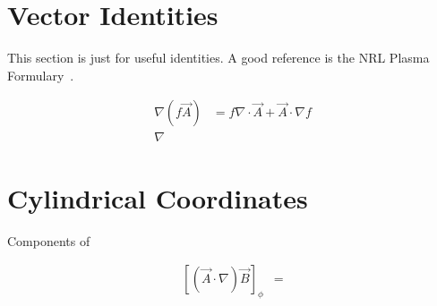 \section{Vector Identities}
This section is just for useful identities. A good reference is the NRL Plasma Formulary~\cite{nrl}.

\begin{align}
  \nabla\left(f\vec A\right)&=f\nabla\cdot\vec A+\vec A\cdot\nabla f\label{eq:nrl7}\\
  \nabla
\end{align}

\section{Cylindrical Coordinates}
Components of

\begin{align}
  \left[\left(\vec A\cdot\nabla\right)\vec B\right]_\phi&=\label{eq:nrlCylCompPhi}
\end{align}
